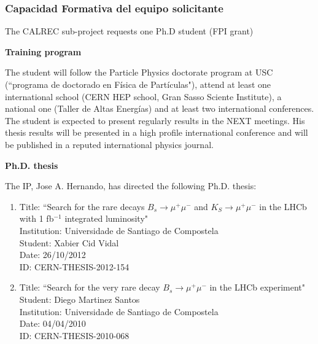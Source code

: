 %
%

\subsubsection*{Capacidad Formativa del equipo solicitante}

The CALREC sub-project requests one Ph.D student (FPI grant)

{\bf Training program}

The student will follow the Particle Physics doctorate program at USC (``programa de doctorado en F\'isica de Part\'iculas"), attend at least one international school (CERN HEP school, Gran Sasso Sciente Institute), a national one (Taller de Altas Energ\'ias) and at least two international conferences.
The student is expected to present regularly results in the NEXT meetings. His thesis results will be presented in a high profile international conference and will be published in a reputed international physics journal.

{\bf Ph.D. thesis}

The IP, Jose A. Hernando, has directed the following Ph.D. thesis:
\begin{enumerate}

\item Title: ``Search for the rare decays $B_s \to \mu^+\mu^-$
and $K_S \to \mu^+\mu^-$ in the LHCb with 1 fb$^{-1}$ integrated luminosity" \\
Institution: Universidade de Santiago de Compostela \\
Student: Xabier Cid Vidal \\
Date: 26/10/2012 \\
ID: CERN-THESIS-2012-154  

\item Title: ``Search for the very rare decay $B_s \to \mu^+\mu^-$ in the LHCb experiment" \\
Student: Diego Martinez Santos \\
Institution: Universidade de Santiago de Compostela \\
Date: 04/04/2010 \\
ID: CERN-THESIS-2010-068 

\end{enumerate}

